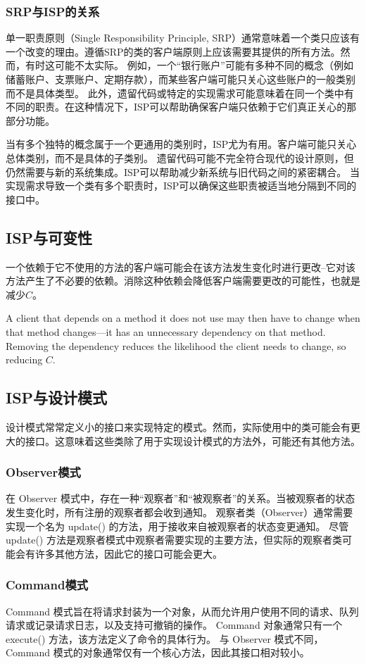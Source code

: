 \subsubsection{SRP与ISP的关系}
单一职责原则（Single Responsibility Principle, SRP）通常意味着一个类只应该有一个改变的理由。遵循SRP的类的客户端原则上应该需要其提供的所有方法。然而，有时这可能不太实际。
例如，一个“银行账户”可能有多种不同的概念（例如储蓄账户、支票账户、定期存款），而某些客户端可能只关心这些账户的一般类别而不是具体类型。
此外，遗留代码或特定的实现需求可能意味着在同一个类中有不同的职责。在这种情况下，ISP可以帮助确保客户端只依赖于它们真正关心的那部分功能。

当有多个独特的概念属于一个更通用的类别时，ISP尤为有用。客户端可能只关心总体类别，而不是具体的子类别。
遗留代码可能不完全符合现代的设计原则，但仍然需要与新的系统集成。ISP可以帮助减少新系统与旧代码之间的紧密耦合。
当实现需求导致一个类有多个职责时，ISP可以确保这些职责被适当地分隔到不同的接口中。

\subsection{ISP与可变性}

一个依赖于它不使用的方法的客户端可能会在该方法发生变化时进行更改--它对该方法产生了不必要的依赖。消除这种依赖会降低客户端需要更改的可能性，也就是减少$C$。

A client that depends on a method it does not use may then have to change when that method changes—it has an unnecessary dependency on that method. Removing the dependency reduces the likelihood the client needs to change, so reducing $C$.
\subsection{ISP与设计模式}
设计模式常常定义小的接口来实现特定的模式。然而，实际使用中的类可能会有更大的接口。这意味着这些类除了用于实现设计模式的方法外，可能还有其他方法。

\subsubsection{Observer模式}
在 Observer 模式中，存在一种“观察者”和“被观察者”的关系。当被观察者的状态发生变化时，所有注册的观察者都会收到通知。
观察者类（Observer）通常需要实现一个名为 update() 的方法，用于接收来自被观察者的状态变更通知。
尽管 update() 方法是观察者模式中观察者需要实现的主要方法，但实际的观察者类可能会有许多其他方法，因此它的接口可能会更大。
\subsubsection{Command模式}
Command 模式旨在将请求封装为一个对象，从而允许用户使用不同的请求、队列请求或记录请求日志，以及支持可撤销的操作。
Command 对象通常只有一个 execute() 方法，该方法定义了命令的具体行为。
与 Observer 模式不同，Command 模式的对象通常仅有一个核心方法，因此其接口相对较小。

